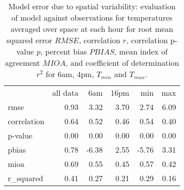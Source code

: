 \documentclass[draft,linenumbers]{agujournal}
\begin{document}
\begin{table}
\centering
\begin{tabular}{lrrrrr}
{} &  all data &     6am &   16pm &   min &  max \\
rmse        &      0.93 &  3.32 & 3.70 &  2.74 & 6.09 \\
correlation &      0.64 &  0.52 & 0.46 &  0.54 & 0.40 \\
p-value     &      0.00 &  0.00 & 0.00 &  0.00 & 0.00 \\
pbias       &      0.78 & -6.38 & 2.55 & -5.76 & 3.31 \\
mioa        &      0.69 &  0.55 & 0.45 &  0.57 & 0.42 \\
r\_squared   &      0.41 &  0.27 & 0.21 &  0.29 & 0.16 \\
\end{tabular}


\caption{Model error due to spatial variability: evaluation of model against observations for temperatures averaged over space at each hour for root mean squared error $RMSE$, correlation  $r$, correlation p-value $p$, percent bias $PBIAS$, mean index of agreement $MIOA$, and coefficient of determination $r^2$ for 6am, 4pm, $T_{min}$ and $T_{max}$.  }
\label{tab:space_error}
\end{table}
%
% 

\end{document}
